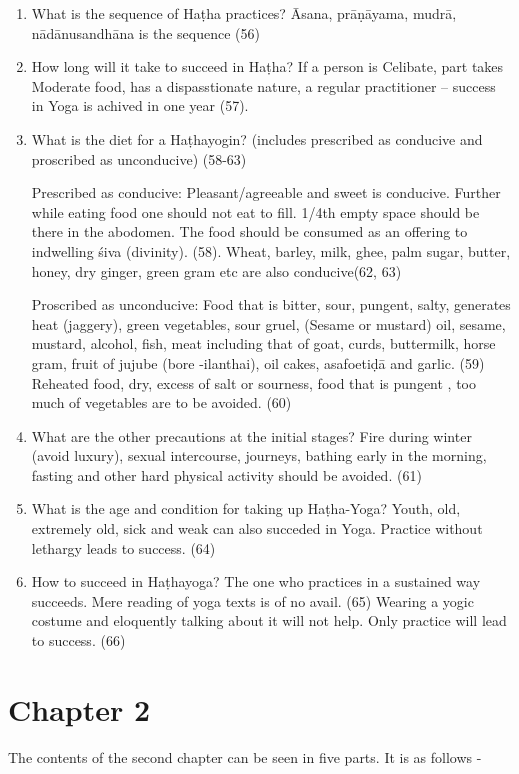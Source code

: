 \begin{enumerate}
\item What is the sequence of Haṭha practices?  Āsana, prāṇāyama, mudrā, nādānusandhāna is the sequence (56)
\item How long will it take to succeed in Haṭha? If a person is Celibate, part takes Moderate food, has a dispasstionate nature, a regular practitioner – success in Yoga is achived in one year (57).
\item What is the diet for a Haṭhayogin? (includes prescribed as conducive and proscribed as unconducive) (58-63)   

Prescribed as conducive: Pleasant/agreeable and sweet is conducive. Further while eating food  one should not eat to fill. 1/4th  empty space should be there in the abodomen. The food should be consumed as an offering to indwelling śiva (divinity). (58). Wheat, barley, milk, ghee, palm sugar, butter, honey, dry ginger, green gram etc  are also conducive(62, 63)

Proscribed as unconducive: Food that is bitter, sour, pungent, salty, generates heat (jaggery), green vegetables, sour gruel, (Sesame or mustard) oil, sesame, mustard, alcohol, fish, meat including that of goat, curds, buttermilk, horse gram, fruit of jujube (bore -ilanthai), oil cakes, asafoetiḍā and garlic. (59) Reheated food, dry, excess of salt or sourness, food that is pungent , too much of vegetables are to be avoided. (60)
\item What are the other precautions at the initial stages?    Fire during winter (avoid luxury), sexual intercourse, journeys, bathing early in the morning, fasting and other hard physical activity should be avoided. (61)  
\item What is the age and condition for taking up Haṭha-Yoga? Youth, old, extremely old, sick and weak can also succeded in Yoga. Practice without lethargy leads to success. (64)
\item How to succeed in Haṭhayoga? The one who practices in a sustained way succeeds. Mere reading of yoga texts is of no avail. (65) Wearing a yogic costume and eloquently talking about it will not help. Only practice will lead to success. (66) 
\end{enumerate}

\section*{Chapter 2}

The contents of the second chapter can be seen in five parts. It is as follows -  

